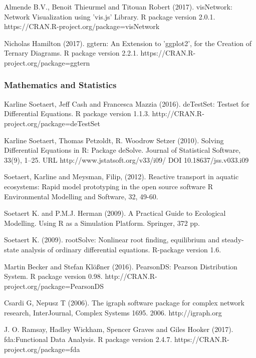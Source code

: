 \documentclass[preprint, 8pt]{elsarticle}
\theoremstyle{definition}
\begin{document}
\begin{thebibliography}{00}
 Almende B.V., Benoit Thieurmel and Titouan Robert (2017). visNetwork:
\newblock Network Visualization using 'vis.js' Library. R package version 2.0.1.
\newblock https://CRAN.R-project.org/package=visNetwork

 Nicholas Hamilton (2017). 
\newblock ggtern: An Extension to 'ggplot2', for the Creation of Ternary Diagrams. 
\newblock R package version 2.2.1. https://CRAN.R-project.org/package=ggtern

\subsubsection{Mathematics and Statistics}

 Karline Soetaert, Jeff Cash and Francesca Mazzia (2016). 
\newblock deTestSet: Testset for Differential Equations. R package version 1.1.3.
\newblock http://CRAN.R-project.org/package=deTestSet

Karline Soetaert, Thomas Petzoldt, R. Woodrow Setzer (2010). 
\newblock Solving Differential Equations in R: Package deSolve. 
\newblock Journal of Statistical Software, 33(9), 1--25. URL http://www.jstatsoft.org/v33/i09/ DOI 10.18637/jss.v033.i09

Soetaert, Karline and Meysman, Filip, (2012).
\newblock Reactive transport in aquatic ecosystems: Rapid model prototyping in the open source software R
\newblock Environmental Modelling and Software, 32, 49-60.

Soetaert K. and P.M.J. Herman (2009).  
\newblock A Practical Guide to Ecological Modelling. 
\newblock Using R as a Simulation Platform.  Springer, 372 pp.

Soetaert K. (2009).  
\newblock rootSolve: Nonlinear root finding, equilibrium and steady-state analysis of ordinary differential equations.  
\newblock R-package version 1.6.

Martin Becker and Stefan Klößner (2016). 
\newblock PearsonDS: Pearson Distribution System. 
\newblock R package version 0.98. http://CRAN.R-project.org/package=PearsonDS

Csardi G, Nepusz T (2006).
\newblock The igraph software package for complex network research,
\newblock  InterJournal, Complex Systems 1695. 2006. http://igraph.org

 J. O. Ramsay, Hadley Wickham, Spencer Graves and Giles Hooker (2017). 
\newblock fda:Functional Data Analysis. 
\newblock R package version 2.4.7. https://CRAN.R-project.org/package=fda


\end{thebibliography}
\end{document}
